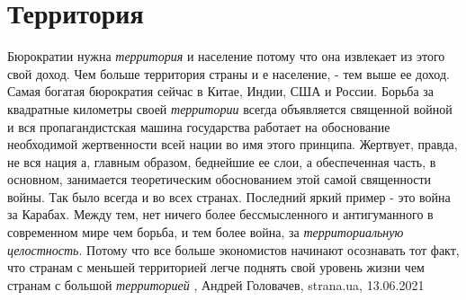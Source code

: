  
 
 
 
 
\chapter{Территория}
\label{sec:slova.territoria}

Бюрократии нужна \emph{территория} и население потому что она извлекает из этого свой
доход. Чем больше территория страны и е население, - тем выше ее доход. Самая
богатая бюрократия сейчас в Китае, Индии, США и России. Борьба за квадратные
километры своей \emph{территории} всегда объявляется священной войной и вся
пропагандистская машина государства работает на обоснование необходимой
жертвенности всей нации во имя этого принципа. Жертвует, правда, не вся нация
а, главным образом, беднейшие ее слои, а обеспеченная часть, в основном,
занимается теоретическим обоснованием этой самой священности войны. Так было
всегда и во всех странах. Последний яркий пример - это война за Карабах.  Между
тем, нет ничего более бессмысленного и антигуманного в современном мире чем
борьба, и тем более война, за \emph{территориальную целостность}. Потому что все
больше экономистов начинают осознавать тот факт, что странам с меньшей
территорией легче поднять свой уровень жизни чем странам с большой \emph{территорией}
, 
Андрей Головачев, strana.ua, 13.06.2021

